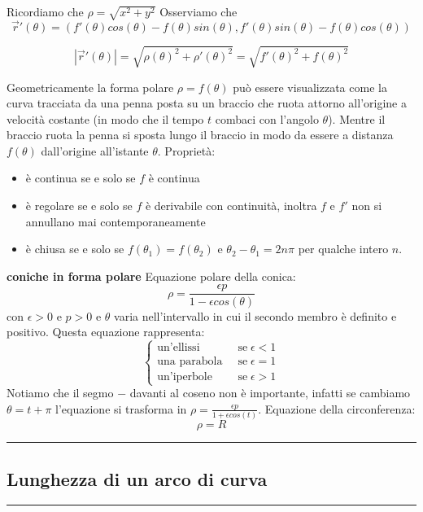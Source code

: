 Ricordiamo che $\rho = \sqrt{x^2 + y^2}$
Osserviamo che 
\[
    \vec{r}'(\theta) = (f'(\theta) cos(\theta)- f(\theta)sin(\theta), f'(\theta) sin(\theta) - f(\theta)cos(\theta))
\]
\begin{tcolorbox}
\[
    |\vec{r}'(\theta)| = \sqrt{\rho(\theta)^2 + \rho'(\theta)^2} = \sqrt{f'(\theta)^2 + f(\theta)^2}
\]
\end{tcolorbox}
Geometricamente la forma polare $\rho = f(\theta)$ può essere visualizzata come la curva tracciata da una penna posta su un braccio che ruota attorno all'origine a velocità costante (in modo che il tempo $t$ combaci con l'angolo $\theta$). Mentre il braccio ruota la penna si sposta lungo il braccio in modo da essere a distanza $f(\theta)$ dall'origine all'istante $\theta$.\newline
\newline
Proprietà:
\begin{itemize}
    \item è continua se e solo se $f$ è continua
    \item è regolare se e solo se $f$ è derivabile con continuità, inoltra $f$ e $f'$ non si annullano mai contemporaneamente
    \item è chiusa se e solo se $f(\theta_1) = f(\theta_2)$ e $\theta_2 - \theta_1 = 2n\pi$ per qualche intero $n$.
\end{itemize}
\textbf{coniche in forma polare}\newline
Equazione polare della conica:
\[
        \rho = \frac{\epsilon p}{1- \epsilon cos(\theta)}
\]
con $\epsilon > 0$ e $p> 0$ e $\theta$ varia nell'intervallo in cui il secondo membro è definito e positivo.\newline
Questa equazione rappresenta:
\[
    \begin{cases}
        \text{un'ellissi} \;\; &\text{se} \; \epsilon< 1\\
        \text{una parabola} \;\; &\text{se} \; \epsilon= 1\\
        \text{un'iperbole} \;\; &\text{se} \; \epsilon> 1
    \end{cases}
\]
Notiamo che il segmo $-$ davanti al coseno non è importante, infatti se cambiamo $\theta = t + \pi$ l'equazione si trasforma in $\rho = \frac{\epsilon p}{1 + \epsilon cos(t)}$.\newline
Equazione della circonferenza:
\[
        \rho = R
\]
\rule{\textwidth}{2pt}
\subsection*{Lunghezza di un arco di curva}
\rule{\textwidth}{0,4pt}
